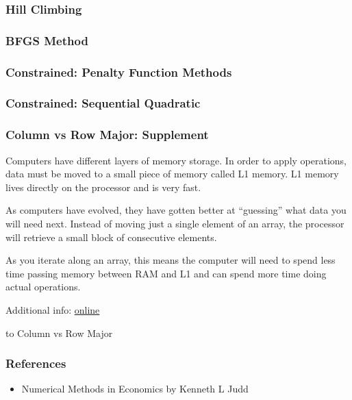 \documentclass[10pt]{beamer}
\begin{document}
\begin{frame} \frametitle{Hill Climbing}

\end{frame}

\begin{frame} \frametitle{BFGS Method}

\end{frame}

\begin{frame} \frametitle{Constrained: Penalty Function Methods}

\end{frame}

\begin{frame} \frametitle{Constrained: Sequential Quadratic}

\end{frame}


\appendix

\begin{frame}[label=ColRowMajor_Supp] \frametitle{Column vs Row Major: Supplement}
  Computers have different layers of memory storage. In order to apply operations, data must be moved to a small piece of memory called L1 memory. L1 memory lives directly on the processor and is very fast.

  As computers have evolved, they have gotten better at ``guessing'' what data you will need next. Instead of moving just a single element of an array, the processor will retrieve a small block of consecutive elements.

  As you iterate along an array, this means the computer will need to spend less time passing memory between RAM and L1 and can spend more time doing actual operations.

  Additional info: \href{https://www.extremetech.com/extreme/188776-how-l1-and-l2-cpu-caches-work-and-why-theyre-an-essential-part-of-modern-chips}{online}

  \hyperlink{ColRowMajor}{} to Column vs Row Major
\end{frame}

\begin{frame} \frametitle{References}
  \begin{itemize}
    \item Numerical Methods in Economics by Kenneth L Judd
  \end{itemize}
\end{frame}
\end{document}
